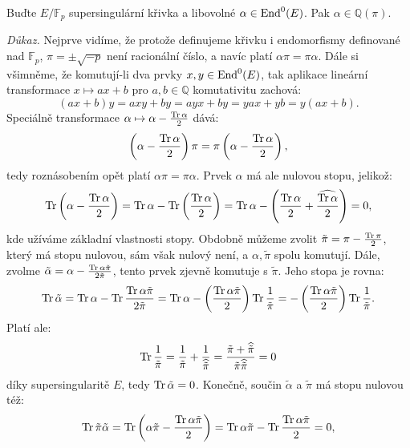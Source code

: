 \documentclass[12pt]{report}
\begin{document}
\begin{veta}
Buďte $E/\mathbb{F}_p$ supersingulární křivka a libovolné $\alpha \in \operatorname{End}^0 (E)$. Pak $\alpha \in \mathbb{Q}(\pi)$.
\end{veta}
\noindent \textit{Důkaz.} Nejprve vidíme, že protože definujeme křivku i endomorfismy definované nad $\mathbb{F}_p$, $\pi = \pm \sqrt{-p}$ není racionální číslo, a navíc platí $\alpha \pi =  \pi \alpha$.
Dále si všimněme, že komutují-li dva prvky $x,y \in \operatorname{End}^0 (E)$, tak aplikace lineární transformace $x \mapsto ax+b$ pro $a,b \in \mathbb{Q}$ komutativitu zachová:
\begin{equation*}
(ax+b)y  = axy + by = ayx + by  = yax + yb = y(ax+b).
\end{equation*}
Speciálně transformace $\alpha \mapsto \alpha - \frac{\operatorname{Tr} \alpha}{2}$ dává:
\begin{equation*}
\left( \alpha - \frac{\operatorname{Tr} \alpha}{2} \right) \pi = \pi \left( \alpha - \frac{\operatorname{Tr} \alpha}{2} \right),
\end{equation*}
tedy roznásobením opět platí $\alpha \pi = \pi \alpha$. Prvek $\alpha$ má ale nulovou stopu, jelikož: $$\operatorname{Tr} \left(\alpha - \frac{\operatorname{Tr} \alpha}{2} \right) = \operatorname{Tr} \alpha - \operatorname{Tr} \left( \frac{\operatorname{Tr} \alpha}{2} \right) = \operatorname{Tr} \alpha - \left(\frac{\operatorname{Tr} \alpha}{2} + \frac{\widehat{\operatorname{Tr} \alpha}}{2} \right) = 0,$$
kde užíváme základní vlastnosti stopy. Obdobně můžeme zvolit $\tilde{\pi} = \pi - \frac{\operatorname{Tr} \pi}{2}$, který má stopu nulovou, sám však nulový není, a $\alpha, \tilde{\pi}$ spolu komutují. Dále, zvolme $\tilde{\alpha} = \alpha - \frac{\operatorname{Tr} \alpha \tilde{\pi}}{2 \tilde{\pi}}$, tento prvek zjevně komutuje s $\tilde{\pi}$. Jeho stopa je rovna:
\begin{equation*}
\operatorname{Tr} \tilde{\alpha} = \operatorname{Tr} \alpha - \operatorname{Tr} \frac{\operatorname{Tr} \alpha \tilde{\pi}}{2 \tilde{\pi}} = \operatorname{Tr} \alpha - \left( \frac{\operatorname{Tr} \alpha \tilde{\pi}}{2}\right) \operatorname{Tr} \frac{1}{\tilde{\pi}} = -\left( \frac{\operatorname{Tr} \alpha \tilde{\pi}}{2}\right) \operatorname{Tr} \frac{1}{\tilde{\pi}}.
\end{equation*}
Platí ale:
\begin{equation*}
\operatorname{Tr} \frac{1}{\tilde{\pi}} = \frac{1}{\tilde{\pi}} + \frac{1}{\widehat{\tilde{\pi}}} = \frac{\tilde{\pi} + \widehat{\tilde{\pi}}}{\tilde{\pi} \widehat{\tilde{\pi}}} = 0
\end{equation*}
díky supersingularitě $E$, tedy $\operatorname{Tr} \tilde{\alpha} = 0$. Konečně, součin $\tilde{\alpha}$ a $\tilde{\pi}$ má stopu nulovou též:
\begin{equation*}
\operatorname{Tr} \tilde{\pi} \tilde{\alpha} = \operatorname{Tr} \left( \alpha \tilde{\pi} - \frac{\operatorname{Tr} \alpha \tilde{\pi}}{2} \right) = \operatorname{Tr} \alpha \tilde{\pi} - \operatorname{Tr} \frac{\operatorname{Tr} \alpha \tilde{\pi}}{2} = 0,
\end{equation*}
\end{document}
